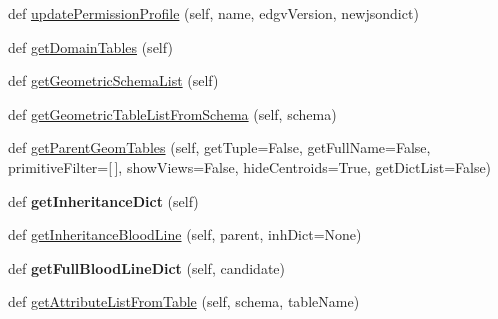 \begin{DoxyCompactItemize}
def \mbox{\hyperlink{class_dsg_tools_1_1_factories_1_1_db_factory_1_1postgis_db_1_1_postgis_db_a02f4672a174dd393920510cc73fa31de}{update\+Permission\+Profile}} (self, name, edgv\+Version, newjsondict)
\item 
def \mbox{\hyperlink{class_dsg_tools_1_1_factories_1_1_db_factory_1_1postgis_db_1_1_postgis_db_a4cc2bf6b8b10081da2a49870dbc4d33a}{get\+Domain\+Tables}} (self)
\item 
def \mbox{\hyperlink{class_dsg_tools_1_1_factories_1_1_db_factory_1_1postgis_db_1_1_postgis_db_a0a3bf0c6d621b4852b7f3d5ff47b2245}{get\+Geometric\+Schema\+List}} (self)
\item 
def \mbox{\hyperlink{class_dsg_tools_1_1_factories_1_1_db_factory_1_1postgis_db_1_1_postgis_db_a9fbbc8c65725c8ea6cd7cf2783ba20a4}{get\+Geometric\+Table\+List\+From\+Schema}} (self, schema)
\item 
def \mbox{\hyperlink{class_dsg_tools_1_1_factories_1_1_db_factory_1_1postgis_db_1_1_postgis_db_ada0c13dfb9ad99d13ac630e4b0830778}{get\+Parent\+Geom\+Tables}} (self, get\+Tuple=False, get\+Full\+Name=False, primitive\+Filter=\mbox{[}$\,$\mbox{]}, show\+Views=False, hide\+Centroids=True, get\+Dict\+List=False)
\item 
\mbox{\label{class_dsg_tools_1_1_factories_1_1_db_factory_1_1postgis_db_1_1_postgis_db_a53fede69694cbaa1683e368b98bbd05c}} 
def {\bfseries get\+Inheritance\+Dict} (self)
\item 
def \mbox{\hyperlink{class_dsg_tools_1_1_factories_1_1_db_factory_1_1postgis_db_1_1_postgis_db_ac90cfbc458f443c776716d93804e19a1}{get\+Inheritance\+Blood\+Line}} (self, parent, inh\+Dict=None)
\item 
\mbox{\label{class_dsg_tools_1_1_factories_1_1_db_factory_1_1postgis_db_1_1_postgis_db_ad29355019e73e970b9a35a4f23aedb04}} 
def {\bfseries get\+Full\+Blood\+Line\+Dict} (self, candidate)
\item 
def \mbox{\hyperlink{class_dsg_tools_1_1_factories_1_1_db_factory_1_1postgis_db_1_1_postgis_db_a7823b451f00f058b7eb2fba7782f5c4e}{get\+Attribute\+List\+From\+Table}} (self, schema, table\+Name)
\item 
\mbox{\label{class_dsg_tools_1_1_factories_1_1_db_factory_1_1postgis_db_1_1_postgis_db_a6a3ec2b10b57e111c7cc834377df659b}} 

\end{DoxyCompactItemize}
